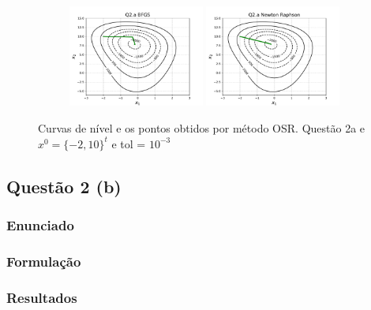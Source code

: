 \documentclass[10pt, a4paper]{article}
\begin{document}
\begin{figure}[H]
\begin{subfigure}[b]{\textwidth}
  \end{subfigure}
  \begin{subfigure}[b]{\textwidth}
    \includegraphics[width=0.49\textwidth]{figuras/Q2.a_BFGS_P0=[-2 10].pdf}
    \includegraphics[width=0.49\textwidth]{figuras/Q2.a_Newton Raphson_P0=[-2 10].pdf}
  \end{subfigure}
  \caption{Curvas de nível e os pontos obtidos por método OSR. Questão 2a e $x^0 = \{-2,10\}^t$ e tol = $10^{-3}$}
\end{figure}

\subsection{Questão 2 (b)}
\subsubsection{Enunciado}
\subsubsection{Formulação}
\subsubsection{Resultados}
\end{document}
